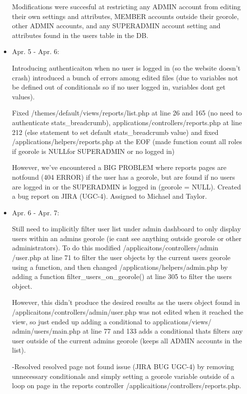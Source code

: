 \documentclass{article}
\begin{document}
\begin{itemize}
Modifications were succesful at restricting any ADMIN account from editing their own settings and attributes, MEMBER accounts outside their georole, other ADMIN accounts, and any SUPERADMIN account setting and attributes found in the users table in the DB.
                                                                               
\item Apr. 5 - Apr. 6:

Introducing authenticaiton when no user is logged in (so the website doesn't crash) introduced a bunch of errors among edited files (due to variables not be defined out of conditionals so if no user logged in, variables dont get values).
            
Fixed /themes/default/views/reports/list.php at line 26 and 165 (no need to authenticate stats\_breadcrumb), applications/controllers/reports.php at line 212 (else statement to set default stats\_breadcrumb value) and fixed /applications/helpers/reports.php at the EOF (made function count all roles if georole is NULLfor SUPERADMIN or no logged in)
                
However, we've encountered a BIG PROBLEM where reports pages are notfound (404 ERROR) if the user has a georole, but are found if no users are logged in or the SUPERADMIN is logged in (georole = NULL). Created a bug report on JIRA (UGC-4). Assigned to Michael and Taylor.
        
\item Apr. 6 - Apr. 7:

Still need to implicitly filter user list under admin dashboard to only display users within an admins georole (ie cant see anything outside georole or other administrators).  To do this modified /applicaitons/controllers/admin
/user.php at line 71 to filter the user objects by the current users georole using a function, and then changed /applications/helpers/admin.php by adding a function filter\_users\_on\_georole() at line 305 to filter the users object.
    
However, this didn't produce the desired results as the users object found in /applicaitons/controllers/admin/user.php was not edited when it reached the view, so just ended up adding a conditional to applications/views/
admin/users/main.php at line 77 and 133 adds a conditional thats filters any user outside of the current 
admins georole (keeps all ADMIN accounts in the list).
                
                
-Resolved resolved page not found issue (JIRA BUG UGC-4) by removing unnecessary conditionals and simply setting a georole variable outside of a loop on page in the reports controller /applicaitions/controllers/reports.php.
      

\end{itemize}
\end{document}
